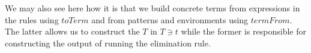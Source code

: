 We may also see here how it is that we build concrete terms from
expressions in the rules using $toTerm$ and from patterns and
environments using $termFrom$. The latter allows us to construct
the $T$ in $T ∋ t$ while the former is responsible for constructing
the output of running the elimination rule.

\begin{code}%
\>[0]%
\>[11]\AgdaSymbol{:}%
\>[14]\AgdaSpace{}%
%
\>[43]\<%
\\
%
\>[14]%
\>[45]\<%
\\
%
\>[14]\AgdaSymbol{(}\AgdaSpace{}%
\AgdaSymbol{:}\AgdaSpace{}%
\AgdaSymbol{)}%
\>[43]\<%
\\
%
\>[14]\AgdaSymbol{((}\AgdaSpace{}%
\AgdaSpace{}%
\AgdaSymbol{(}\AgdaSpace{}%
\AgdaSymbol{))}\AgdaSpace{}%
\AgdaSymbol{)}%
\>[43]\<%
\\
%
\>[14]\AgdaSymbol{((}\AgdaSpace{}%
\AgdaSpace{}%
\AgdaSymbol{(}\AgdaSpace{}%
\AgdaSymbol{))}\AgdaSpace{}%
\AgdaSymbol{)}%
\>[43]\<%
\\
%
\>[14]\AgdaSpace{}%
\<%
\\
\>[0]\AgdaSpace{}%
\AgdaSymbol{\{}\AgdaSymbol{\}}\AgdaSpace{}%
\AgdaSpace{}%
\AgdaSpace{}%
\AgdaSpace{}%
\AgdaSpace{}%
\AgdaSpace{}%
\AgdaSpace{}%
\AgdaSpace{}%
\AgdaSymbol{)}\AgdaSpace{}%
\AgdaSpace{}%
\AgdaSpace{}%
\<%
\\
\>[0][@{}l@{\AgdaIndent{0}}]%
\>[2]\AgdaSymbol{=}%
\>[576I]\<%
\\
\>[576I][@{}l@{\AgdaIndent{0}}]%
\>[5]\AgdaSymbol{\AgdaUnderscore{}}\AgdaSpace{}%
\AgdaSpace{}%
%
\>[579I]\AgdaSpace{}%
\AgdaSpace{}%
\<%
\\
\>[.][@{}l@{}]\<[579I]%
\>[20]\AgdaSymbol{(}\AgdaSpace{}%
\AgdaSymbol{(}\AgdaSpace{}%

\end{code}
